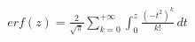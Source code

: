 \documentclass[preview]{standalone}
\begin{document}
\begin{align*}
erf(z) = { \frac{2}{\sqrt{\pi}} } \sum_{k=0}^{+\infty} \int_0^z { { \frac{(-t^2)^k}{k!} } } \, dt
\end{align*}
\end{document}
